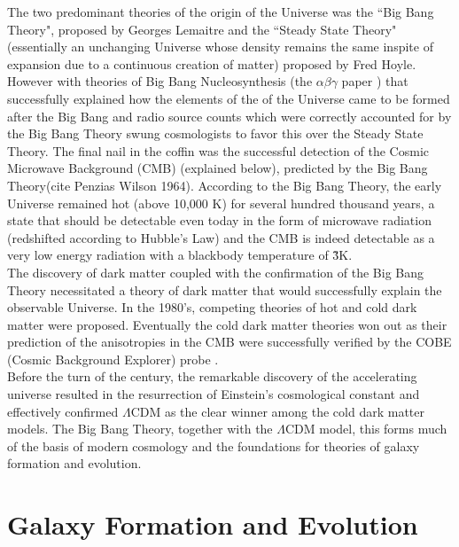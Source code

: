 The two predominant theories of the origin of the Universe was the ``Big Bang Theory", proposed by Georges Lemaitre and the ``Steady State Theory"(essentially an unchanging Universe whose density remains the same inspite of expansion due to a continuous creation of matter) proposed by Fred Hoyle. However with theories of Big Bang Nucleosynthesis (the $\alpha\beta\gamma$ paper \citep{alpher_origin_1948}) that successfully explained how the elements of the of the Universe came to be formed after the Big Bang and radio source counts which were correctly accounted for by the Big Bang Theory swung cosmologists to favor this over the Steady State Theory. The final nail in the coffin was the successful detection of the Cosmic Microwave Background (CMB) (explained below), predicted by the Big Bang Theory(cite Penzias Wilson 1964). According to the Big Bang Theory, the early Universe remained hot (above 10,000 K) for several hundred thousand years, a state that should be detectable even today in the form of microwave radiation (redshifted according to Hubble's Law) and the CMB is indeed detectable as a very low energy radiation with a blackbody temperature of \~ 3K.\\

The discovery of dark matter coupled with the confirmation of the Big Bang Theory necessitated a theory of dark matter that would successfully explain the observable Universe. In the 1980's, competing theories of hot and cold dark matter \citep{1985ApJ...292..371D} were proposed. Eventually the cold dark matter theories won out as their prediction of the anisotropies in the CMB \citep{peebles_large-scale_1982} were successfully verified by the COBE (Cosmic Background Explorer) probe \citep{riess_observational_1998}.\\

Before the turn of the century, the remarkable discovery of the accelerating universe \citep{Riess:1998cb} resulted in the resurrection of Einstein's cosmological constant and effectively confirmed $\Lambda$CDM as the clear winner among the cold dark matter models. The Big Bang Theory, together with the $\Lambda$CDM model, this forms much of the basis of modern cosmology and the foundations for theories of galaxy formation and evolution.\\

\section{Galaxy Formation and Evolution}

